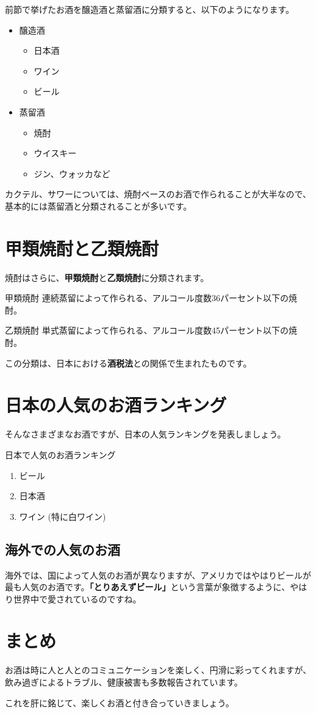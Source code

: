 \documentclass[10pt,titlepage]{ltjsarticle}
\begin{document}
前節で挙げたお酒を醸造酒と蒸留酒に分類すると、以下のようになります。
\begin{itemize}
\item
醸造酒
\begin{itemize}
  \item
  日本酒
  \item
  ワイン
  \item
  ビール
\end{itemize}
\item
蒸留酒
\begin{itemize}
  \item
  焼酎
  \item
  ウイスキー
  \item
  ジン、ウォッカなど
\end{itemize}
\end{itemize}
カクテル、サワーについては、焼酎ベースのお酒で作られることが大半なので、基本的には蒸留酒と分類されることが多いです。
\section{甲類焼酎と乙類焼酎}
焼酎はさらに、{\bf 甲類焼酎}と{\bf 乙類焼酎}に分類されます。
\begin{itembox}[l]{甲類焼酎}
連続蒸留によって作られる、アルコール度数36パーセント以下の焼酎。
\end{itembox}

\begin{itembox}[l]{乙類焼酎}
単式蒸留によって作られる、アルコール度数45パーセント以下の焼酎。
\end{itembox}

この分類は、日本における{\bf 酒税法}との関係で生まれたものです。

\section{日本の人気のお酒ランキング}
そんなさまざまなお酒ですが、日本の人気ランキングを発表しましょう。
\begin{itembox}[l]{日本で人気のお酒ランキング}
\begin{enumerate}[第1位.]
\item
ビール
\item
日本酒
\item
ワイン (特に白ワイン)
\end{enumerate}
\end{itembox}
\subsection{海外での人気のお酒}
海外では、国によって人気のお酒が異なりますが、アメリカではやはりビールが最も人気のお酒です。{\bf 「とりあえずビール」}という言葉が象徴するように、やはり世界中で愛されているのですね。
\section{まとめ}
お酒は時に人と人とのコミュニケーションを楽しく、円滑に彩ってくれますが、飲み過ぎによるトラブル、健康被害も多数報告されています。
\begin{center}
\Large{}
\end{center}
これを肝に銘じて、楽しくお酒と付き合っていきましょう。
\end{document}
